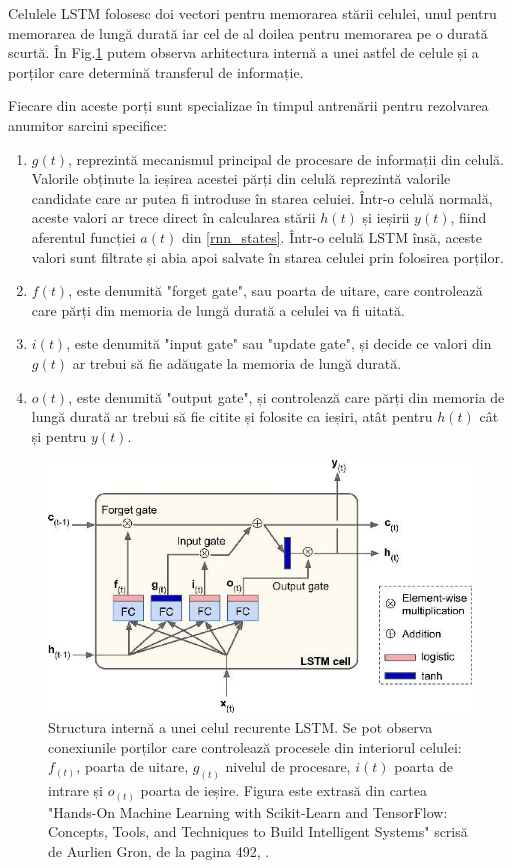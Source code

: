 \documentclass[a4paper,12pt]{book}
\begin{document}
				Celulele LSTM folosesc doi vectori pentru memorarea stării celulei, unul pentru memorarea de lungă durată iar cel de al doilea pentru memorarea pe o durată scurtă. În Fig.\ref{fig:lstm} putem observa arhitectura internă a unei astfel de celule și a porților care determină transferul de informație. \par
				Fiecare din aceste porți sunt specializae în timpul antrenării pentru rezolvarea anumitor sarcini specifice:
				\begin{enumerate}
					\item $g(t)$, reprezintă mecanismul principal de procesare de informații din celulă. Valorile obținute la ieșirea acestei părți din celulă reprezintă valorile candidate care ar putea fi introduse în starea celuiei.  Într-o celulă normală, aceste valori ar trece direct în calcularea stării $h(t)$ și ieșirii $y(t)$, fiind aferentul funcției $a(t)$ din \ref{rnn_states}. Într-o celulă LSTM însă, aceste valori sunt filtrate și abia apoi salvate în starea celulei prin folosirea porților.
					\item $f(t)$, este denumită "forget gate", sau poarta de uitare, care controlează care părți din memoria de lungă durată a celulei va fi uitată.
					\item $i(t)$, este denumită "input gate" sau "update gate", și decide ce valori din $g(t)$ ar trebui să fie adăugate la memoria de lungă durată.
					\item $o(t)$, este denumită "output gate", și controlează care părți din memoria de lungă durată ar trebui să fie citite și folosite ca ieșiri, atât pentru $h(t)$ cât și pentru $y(t)$. 
				\end{enumerate}
			
					\begin{figure}[t]
					\centering
					\includegraphics[scale=0.5]{lstm}
					\caption{Structura internă a unei celul recurente LSTM. Se pot observa conexiunile porților care controlează procesele din interiorul celulei: $f_{(t)}$, poarta de uitare, $g_{(t)}$ nivelul de procesare, $i{(t)}$ poarta de intrare și $o_{(t)}$ poarta de ieșire. Figura este extrasă din cartea "Hands-On Machine Learning with Scikit-Learn and TensorFlow: Concepts, Tools, and Techniques to Build Intelligent Systems" scrisă de Aurlien Gron, de la pagina 492, \cite{hands}.}
					\label{fig:lstm}
				\end{figure} 
\end{document}
